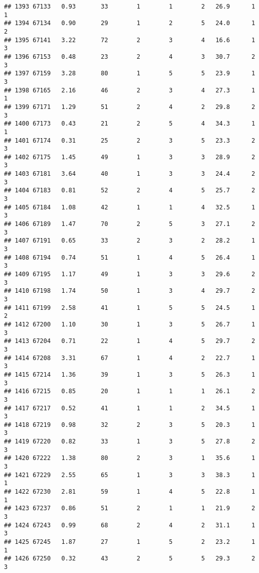 \documentclass[
]{article}
\begin{document}
\begin{verbatim}
## 1393 67133   0.93       33        1        1        2   26.9      1      1
## 1394 67134   0.90       29        1        2        5   24.0      1      2
## 1395 67141   3.22       72        2        3        4   16.6      1      3
## 1396 67153   0.48       23        2        4        3   30.7      2      3
## 1397 67159   3.28       80        1        5        5   23.9      1      3
## 1398 67165   2.16       46        2        3        4   27.3      1      1
## 1399 67171   1.29       51        2        4        2   29.8      2      3
## 1400 67173   0.43       21        2        5        4   34.3      1      1
## 1401 67174   0.31       25        2        3        5   23.3      2      3
## 1402 67175   1.45       49        1        3        3   28.9      2      3
## 1403 67181   3.64       40        1        3        3   24.4      2      3
## 1404 67183   0.81       52        2        4        5   25.7      2      3
## 1405 67184   1.08       42        1        1        4   32.5      1      3
## 1406 67189   1.47       70        2        5        3   27.1      2      3
## 1407 67191   0.65       33        2        3        2   28.2      1      3
## 1408 67194   0.74       51        1        4        5   26.4      1      3
## 1409 67195   1.17       49        1        3        3   29.6      2      3
## 1410 67198   1.74       50        1        3        4   29.7      2      3
## 1411 67199   2.58       41        1        5        5   24.5      1      2
## 1412 67200   1.10       30        1        3        5   26.7      1      3
## 1413 67204   0.71       22        1        4        5   29.7      2      3
## 1414 67208   3.31       67        1        4        2   22.7      1      3
## 1415 67214   1.36       39        1        3        5   26.3      1      3
## 1416 67215   0.85       20        1        1        1   26.1      2      3
## 1417 67217   0.52       41        1        1        2   34.5      1      3
## 1418 67219   0.98       32        2        3        5   20.3      1      3
## 1419 67220   0.82       33        1        3        5   27.8      2      3
## 1420 67222   1.38       80        2        3        1   35.6      1      3
## 1421 67229   2.55       65        1        3        3   38.3      1      1
## 1422 67230   2.81       59        1        4        5   22.8      1      1
## 1423 67237   0.86       51        2        1        1   21.9      2      3
## 1424 67243   0.99       68        2        4        2   31.1      1      3
## 1425 67245   1.87       27        1        5        2   23.2      1      1
## 1426 67250   0.32       43        2        5        5   29.3      2      3

\end{verbatim}
\end{document}
